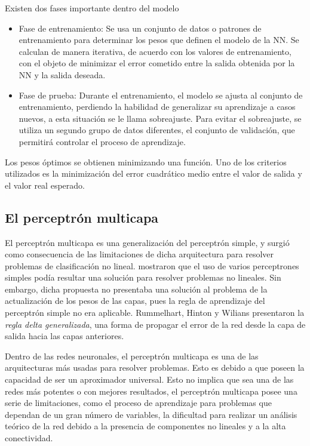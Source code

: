 Existen dos fases importante dentro del modelo
\begin{itemize}
	\item Fase de entrenamiento: Se usa un conjunto de datos o patrones de entrenamiento para determinar los pesos que definen el modelo de la NN. Se calculan de manera iterativa, de acuerdo con los valores de entrenamiento, con el objeto de minimizar el error cometido entre la salida obtenida por la NN y la salida deseada.

	\item Fase de prueba: Durante el entrenamiento, el modelo se ajusta al conjunto de entrenamiento, perdiendo la habilidad de generalizar su aprendizaje a casos nuevos, a esta situación se le llama sobreajuste.
	Para evitar el sobreajuste, se utiliza un segundo grupo de datos diferentes, el conjunto de validación, que permitirá controlar el proceso de aprendizaje.
\end{itemize}
Los pesos óptimos se obtienen minimizando una función. Uno de los criterios utilizados es la minimización del error cuadrático medio entre el valor de salida y el valor real esperado.






\subsection{El perceptrón multicapa}
El perceptrón multicapa es una generalización del perceptrón simple, y surgió como consecuencia de las limitaciones de dicha arquitectura para resolver problemas de clasificación no lineal.  mostraron que el uso de varios perceptrones simples podía resultar una solución para resolver problemas no lineales. Sin embargo, dicha propuesta no presentaba una solución al problema de la actualización de los pesos de las capas, pues la regla de aprendizaje del perceptrón simple no era aplicable. Rummelhart, Hinton y Wilians presentaron la {\em regla delta generalizada}, una forma de propagar el error de la red desde la capa de salida hacia las capas anteriores.

Dentro de las redes neuronales, el perceptrón multicapa es una de las arquitecturas más usadas para resolver problemas. Esto es debido a que poseen la capacidad de ser un aproximador universal. Esto no implica que sea una de las redes más potentes o con mejores resultados, el perceptrón multicapa posee una serie de limitaciones, como el proceso de aprendizaje para problemas que dependan de un gran número de variables, la dificultad para realizar un análisis teórico de la red debido a la presencia de componentes no lineales y a la alta conectividad.

